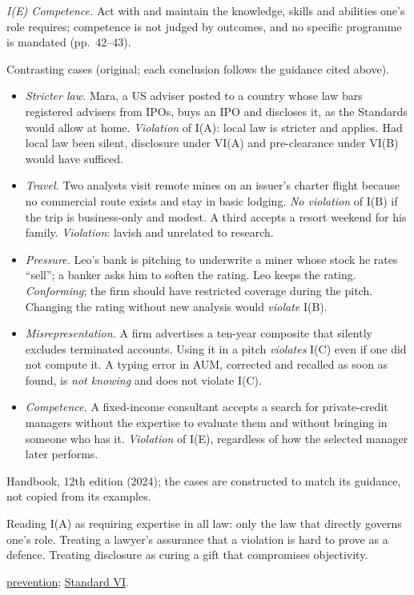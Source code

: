 \begin{qfrule}
\emph{I(E) Competence.} Act with and maintain the knowledge, skills and abilities one's role requires; competence is not judged by outcomes, and no specific programme is mandated (pp.~42--43).

 Contrasting cases (original; each conclusion follows the guidance cited above).
\begin{itemize}
\item \emph{Stricter law.} Mara, a US adviser posted to a country whose law bars registered advisers from IPOs, buys an IPO and discloses it, as the Standards would allow at home. \emph{Violation} of I(A): local law is stricter and applies. Had local law been silent, disclosure under VI(A) and pre-clearance under VI(B) would have sufficed.
\item \emph{Travel.} Two analysts visit remote mines on an issuer's charter flight because no commercial route exists and stay in basic lodging. \emph{No violation} of I(B) if the trip is business-only and modest. A third accepts a resort weekend for his family. \emph{Violation}: lavish and unrelated to research.
\item \emph{Pressure.} Leo's bank is pitching to underwrite a miner whose stock he rates ``sell''; a banker asks him to soften the rating. Leo keeps the rating. \emph{Conforming}; the firm should have restricted coverage during the pitch. Changing the rating without new analysis would \emph{violate} I(B).
\item \emph{Misrepresentation.} A firm advertises a ten-year composite that silently excludes terminated accounts. Using it in a pitch \emph{violates} I(C) even if one did not compute it. A typing error in AUM, corrected and recalled as soon as found, is \emph{not knowing} and does not violate I(C).
\item \emph{Competence.} A fixed-income consultant accepts a search for private-credit managers without the expertise to evaluate them and without bringing in someone who has it. \emph{Violation} of I(E), regardless of how the selected manager later performs.
\end{itemize}

 Handbook, 12th edition (2024); the cases are constructed to match its guidance, not copied from its examples.

 Reading I(A) as requiring expertise in all law: only the law that directly governs one's role. Treating a lawyer's assurance that a violation is hard to prove as a defence. Treating disclosure as curing a gift that compromises objectivity.

 \hyperref[meth:preventing-professionalism-violations]{prevention}; \hyperref[rule:standard-conflicts-of-interest]{Standard VI}.

\end{qfrule}

